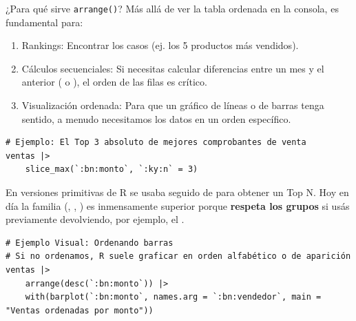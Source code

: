 \documentclass[8pt]{beamer}
\begin{document}
\begin{frame}[fragile]{¿Para qué sirve \texttt{arrange()}?}
Más allá de ver la tabla ordenada en la consola,  es fundamental para:
\begin{enumerate}
	\item Rankings: Encontrar los casos  (ej. los 5 productos más vendidos).
	\item Cálculos secuenciales: Si necesitas calcular diferencias entre un mes y el anterior ( o ), el orden de las filas es crítico.
	\item Visualización ordenada: Para que un gráfico de líneas o de barras tenga sentido, a menudo necesitamos los datos en un orden específico.
\end{enumerate}

\begin{lstlisting}[style=RScript]
# Ejemplo: El Top 3 absoluto de mejores comprobantes de venta
ventas |>
	slice_max(`:bn:monto`, `:ky:n` = 3)
\end{lstlisting}

\begin{block}{}
En versiones primitivas de R se usaba  seguido de  para obtener un Top N. Hoy en día la familia  (, , ) es inmensamente superior porque \textbf{respeta los grupos} si usás  previamente devolviendo, por ejemplo, el .
\end{block}

\begin{lstlisting}[style=RScript]
# Ejemplo Visual: Ordenando barras
# Si no ordenamos, R suele graficar en orden alfabético o de aparición
ventas |>
	arrange(desc(`:bn:monto`)) |>
	with(barplot(`:bn:monto`, names.arg = `:bn:vendedor`, main = "Ventas ordenadas por monto"))
\end{lstlisting}
\end{frame}
\end{document}
